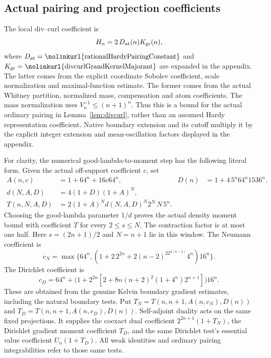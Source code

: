 \documentclass[11pt,a4paper]{article}
\numberwithin{equation}{section}
\theoremstyle{definition}
\theoremstyle{remark}
\newcommand{\lean}[1]{\nolinkurl{#1}}
\begin{document}
\subsection{Actual pairing and projection coefficients}
The local div--curl coefficient is
\[
 H_n=2\,D_{\rm at}(n)K_{\rm gr}(n),
\]
where $D_{\rm at}=\text{\lean{rationalHardyPairingConstant}}$ and
$K_{\rm gr}=\text{\lean{divcurlGrandKernelMajorant}}$ are expanded in the
appendix. The latter comes from the explicit coordinate Sobolev
coefficient, scale normalization and maximal-function estimate.
The former comes from the actual Whitney partition, normalized mass,
compensation and atom coefficients. The mass normalization uses
$V_n^{-1}\leq(n+1)^n$. Thus this is a bound for the actual ordinary
pairing in Lemma~\ref{lem:divcurl}, rather than an assumed Hardy
representation coefficient. Native boundary extension and its cutoff
multiply it by the explicit integer extension and mean-oscillation
factors displayed in the appendix.

For clarity, the numerical good-lambda-to-moment step has the following
literal form. Given the actual off-support coefficient $c$, set
\begin{align*}
 A(n,c)&=1+64^n+16c64^n,&
 D(n)&=1+4\,5^n64^n1536^n,\\
 d(N,A,D)&=4(1+D)(1+A)^N,\\
 T(n,N,A,D)&=2(1+A)^Nd(N,A,D)^N2^N\,N\,5^n.
\end{align*}
Choosing the good-lambda parameter $1/d$ proves the actual density moment
bound with coefficient $T$ for every $2\leq s\leq N$. The contraction
factor is at most one half. Here $s=(2n+1)/2$ and $N=n+1$ lie in this
window. The Neumann coefficient is
\[
 c_N=\max\{64^n,(1+2\,2^{2n}
       +2(n-2)^22^{2(n-2)}4^n)16^n\}.
\]
The Dirichlet coefficient is
\[
 c_D=64^n+
 \bigl(1+2^{2n}[2+8n(n+2)^2(1+4^n)2^{n+1}]\bigr)16^n.
\]
These are obtained from the genuine Kelvin boundary gradient estimates,
including the natural boundary tests. Put
$T_N=T(n,n+1,A(n,c_N),D(n))$ and
$T_D=T(n,n+1,A(n,c_D),D(n))$.
Self-adjoint duality acts on the same fixed projections. It supplies the
coexact dual coefficient $2^{2n+1}(1+T_N)$, the Dirichlet gradient moment
coefficient $T_D$, and the same Dirichlet test's essential value
coefficient $U_n(1+T_D)$. All weak identities and ordinary pairing
integrabilities refer to those same tests.
\end{document}
